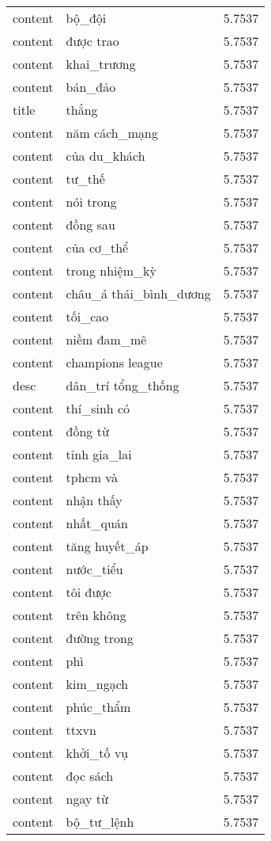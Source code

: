 \documentclass{article}
\begin{document}
\begin{tabular}{lll}
content & bộ\_đội & 5.7537\\
content & được trao & 5.7537\\
content & khai\_trương & 5.7537\\
content & bán\_đảo & 5.7537\\
title & thắng & 5.7537\\
content & năm cách\_mạng & 5.7537\\
content & của du\_khách & 5.7537\\
content & tư\_thế & 5.7537\\
content & nói trong & 5.7537\\
content & đồng sau & 5.7537\\
content & của cơ\_thể & 5.7537\\
content & trong nhiệm\_kỳ & 5.7537\\
content & châu\_á thái\_bình\_dương & 5.7537\\
content & tối\_cao & 5.7537\\
content & niềm đam\_mê & 5.7537\\
content & champions league & 5.7537\\
desc & dân\_trí tổng\_thống & 5.7537\\
content & thí\_sinh có & 5.7537\\
content & đồng từ & 5.7537\\
content & tỉnh gia\_lai & 5.7537\\
content & tphcm và & 5.7537\\
content & nhận thấy & 5.7537\\
content & nhất\_quán & 5.7537\\
content & tăng huyết\_áp & 5.7537\\
content & nước\_tiểu & 5.7537\\
content & tôi được & 5.7537\\
content & trên không & 5.7537\\
content & đường trong & 5.7537\\
content & phì & 5.7537\\
content & kim\_ngạch & 5.7537\\
content & phúc\_thẩm & 5.7537\\
content & ttxvn & 5.7537\\
content & khởi\_tố vụ & 5.7537\\
content & đọc sách & 5.7537\\
content & ngay từ & 5.7537\\
content & bộ\_tư\_lệnh & 5.7537\\

\end{tabular}
\end{document}
